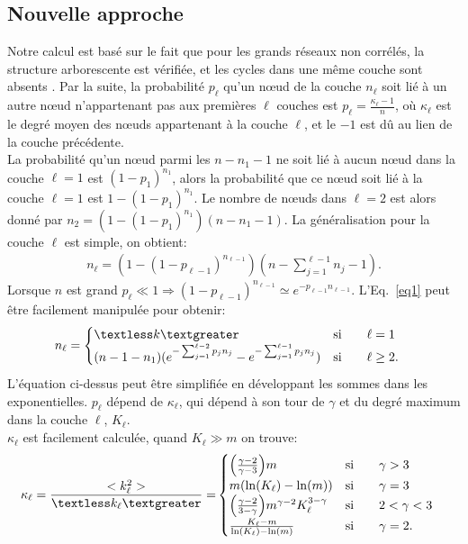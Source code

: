 \subsection{Nouvelle approche}
Notre calcul est basé sur le fait que pour les grands réseaux non corrélés, la structure arborescente est vérifiée, et les cycles dans une même couche sont absents \cite{Cohen-Havlin2003,Cohen-Havlin2009}. Par la suite, la probabilité $ p_{\ell} $ qu'un nœud de la couche $n_\ell$ soit lié à un autre nœud n'appartenant pas aux premières $\ell$ couches est $p_{\ell}=\frac{\kappa_{\ell}-1}{n}$, où $\kappa_{\ell}$ est le degré moyen des nœuds appartenant à la couche $\ell$, et le $-1$ est dû au lien de la couche précédente. \\
La probabilité qu'un nœud parmi les $n-n_1-1$ ne soit lié à aucun nœud dans la couche $\ell=1$ est $(1-p_1)^{n_1}$, alors la probabilité que ce nœud soit lié à la couche $\ell=1$ est $1-(1-p_1)^{n_1}$. Le nombre de nœuds dans $\ell=2$ est alors donné par $n_2=(1- (1-p_1)^{n_1})(n-n_1-1)$. La généralisation pour la couche $\ell$ est simple, on obtient:
\begin{align}
n_{\ell}= (1-(1-p_{\ell-1})^{n_{\ell-1}})(n-\sum_{j=1}^{\ell-1} n_j-1).
\label{eq1}
\end{align}
Lorsque $n$ est grand $p_{\ell}\ll1 \Longrightarrow (1-p_{\ell-1})^{n_{\ell-1}}\simeq e^{-p_{\ell-1}n_{\ell-1}} $. L'Eq.~\eqref{eq1} peut être facilement manipulée pour obtenir:
\begin{align}
n_{\ell} &=
\begin{cases}
\km & \text{si}\qquad \ell=1 \\
(n-1-n_1)(e^{-\sum_{j=1}^{\ell-2}p_j n_j}-e^{-\sum_{j=1}^{\ell-1}p_j n_j}) & \text{si}\qquad \ell \ge 2.
\end{cases}
\label{eq2}
\end{align}
L'équation ci-dessus peut être simplifiée en développant les sommes dans les exponentielles. $p_{\ell}$ dépend de $\kappa_{\ell}$, qui dépend à son tour de $\gamma$ et du degré maximum dans la couche $\ell$, $K_{\ell}$.\\
$\kappa_{\ell}$ est facilement calculée, quand $K_{\ell}\gg m$ on trouve:
\begin{align}
\kappa_{\ell} =\frac{<k_{\ell}^2>}{\textless k_{\ell} \textgreater}=&
\begin{cases}
\Big(\frac{\gamma-2}{\gamma-3}\Big)m & \text{si} \qquad \gamma >3 \\ 
m (\ln(K_{\ell})-\ln(m))  & \text{si} \qquad \gamma =3 \\
\Big(\frac{\gamma-2}{3-\gamma}\Big)m^{\gamma-2} K_{\ell}^{3-\gamma}  & \text{si} \qquad 2<\gamma<3 \\
\frac{K_{\ell}-m}{\ln(K_{\ell})-\ln(m)} & \text{si} \qquad \gamma=2.
\end{cases}
\label{eq4}
\end{align}
